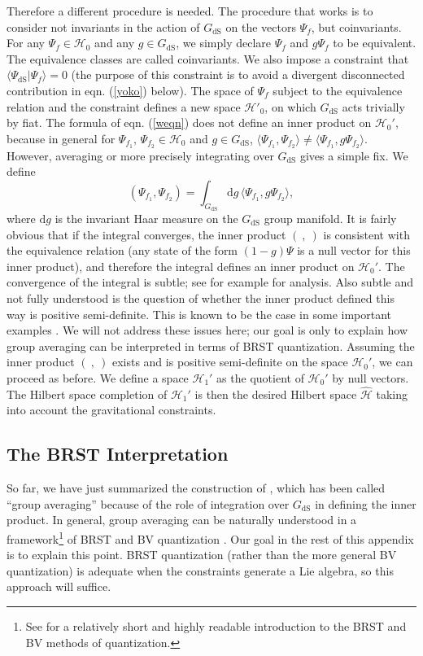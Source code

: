 \documentclass[11pt,a4paper]{article}
\def\be{\begin{equation}}
\def\ee{\end{equation}}
\def\h{\widehat}
\def\d{{\mathrm d}}
\def\h{\widehat}
\def\H{{\mathcal H}}
\def\dS{{\mathrm{dS}}}
\def\la{\langle}
\def\ra{\rangle}
\begin{document}
 Therefore a different procedure is needed.   The procedure that works is
to consider not invariants in the action of $G_\dS$ on the vectors $\Psi_f$, but coinvariants.    For any $\Psi_f\in\H_0$ and any $g\in G_\dS$, we simply declare
$\Psi_f$ and $g\Psi_f$ to be equivalent.  The equivalence classes are called coinvariants.
  We also impose a constraint that $\la \Psi_\dS|\Psi_f\ra=0$ (the purpose of this constraint is to avoid a divergent disconnected contribution in
eqn. (\ref{yoko}) below).  The space of $\Psi_f$ subject to the equivalence relation and the constraint 
 defines a new space $\H'_0$,  on which $G_\dS$ acts trivially by fiat.
 The formula of eqn. (\ref{weqn}) does not define an inner product on $\H_0'$, because in general for $\Psi_{f_1}, \,\Psi_{f_2}\in\H_0$ and $g\in G_\dS$, 
$\la\Psi_{f_1},\Psi_{f_2}\ra\not=\la\Psi_{f_1},g\Psi_{f_2}\ra$.  However, averaging or more precisely integrating over $G_\dS$ gives
a simple fix.   We define 
\be\label{yoko} \left( \Psi_{f_1},\Psi_{f_2}\right) =\int_{G_\dS} \d g\, \la \Psi_{f_1},g \Psi_{f_2}\ra,\ee
where $\d    g$ is the invariant Haar measure on the $G_\dS$ group manifold.
It is fairly obvious that if the integral converges, the inner product $(~,~)$  is consistent with the equivalence relation (any state of the form $(1-g)\Psi$ is a null vector
for this inner product), and therefore the integral defines an inner product on $\H_0'$.
The convergence of the integral is subtle; see for example \cite{marolf} for analysis.  Also subtle and not fully understood is the question of whether the inner product
defined this way is positive semi-definite. This is known to be the case in some important examples \cite{higuchi}.  
We will not address these issues here; our goal is only to explain how group averaging can be interpreted in terms of
BRST quantization.
Assuming  the inner product $(~,~)$ exists and  is positive semi-definite on the space $\H_0'$, 
we can proceed  as before.  We define a space $\H_1'$ as the quotient of $\H_0'$ by null vectors.
The Hilbert space completion of $\H_1'$ is then the desired Hilbert space $\h\H$ taking into account the gravitational constraints.   

  \subsection{The BRST Interpretation}\label{BRST}

So far, we have just summarized the construction of \cite{higuchi,marolf}, which has been called ``group averaging'' because of the role of integration over $G_\dS$
in defining the inner product.   In general, group averaging can be naturally understood in a framework\footnote{See \cite{Henneaux} for
a relatively short and highly readable introduction to the BRST and BV methods of quantization.}  of BRST and BV quantization
\cite{shvedov}.  Our goal in the rest of this appendix is to explain this point.  BRST quantization (rather than the more
general BV quantization) is adequate when the constraints generate a Lie algebra, so this  approach will suffice.
\end{document}
